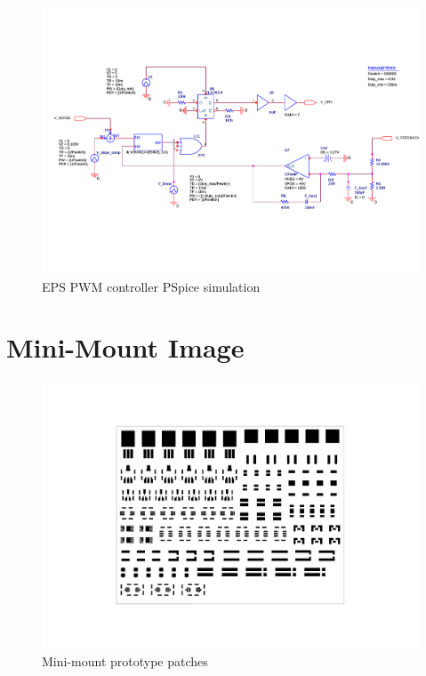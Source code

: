 \begin{figure}
\centering
\includegraphics[scale=0.8]{figures/fig_CDR_PSpice_PWM}
\caption{EPS PWM controller PSpice simulation}
\label{fig:PSpice_PWM}
\end{figure}
%
\newpage

\section{Mini-Mount Image}
\label{app:EPS_mini-mount}
%
\begin{figure}[h!]
\centering
\includegraphics[scale=1,angle=90]{figures/fig_CDR_Mini-mounts}
\caption{Mini-mount prototype patches}
\label{fig:mini-mount}
\end{figure}
%
